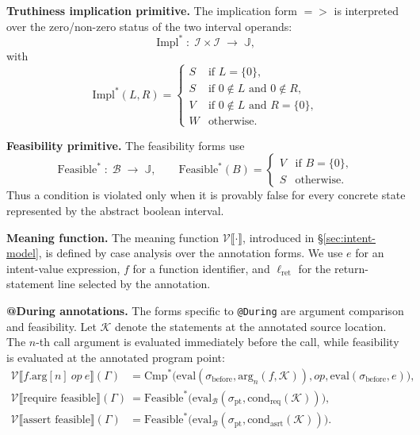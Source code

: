 \documentclass[pdflatex,sn-basic]{sn-jnl}%
\theoremstyle{thmstyleone}%
\theoremstyle{thmstyletwo}%
\theoremstyle{thmstylethree}%
\begin{document}
\smallskip
\noindent\textbf{Truthiness implication primitive.}
The implication form ${=}{>}$ is interpreted over the zero/non-zero status of
the two interval operands:
\[
\text{Impl}^*
  \;:\; \mathcal{I}\times\mathcal{I}\;\to\;\mathbb{J},
\]
with
\[
\text{Impl}^*(L,R)
=
\begin{cases}
S & \text{if } L=\{0\}, \\[2pt]
S & \text{if } 0\notin L \text{ and } 0\notin R, \\[2pt]
V & \text{if } 0\notin L \text{ and } R=\{0\}, \\[2pt]
W & \text{otherwise.}
\end{cases}
\]

\smallskip
\noindent\textbf{Feasibility primitive.}
The feasibility forms use
\[
\text{Feasible}^*
  \;:\; \mathcal{B}\;\to\;\mathbb{J},
\qquad
\text{Feasible}^*(B)
=
\begin{cases}
V & \text{if } B=\{0\}, \\
S & \text{otherwise.}
\end{cases}
\]
Thus a condition is violated only when it is provably false for every concrete
state represented by the abstract boolean interval.

\smallskip
\noindent\textbf{Meaning function.}
The meaning function
$\mathcal{V}\llbracket\cdot\rrbracket$,
introduced in \S\ref{sec:intent-model}, is defined by case analysis over the
annotation forms.
We use $e$ for an intent-value expression, $f$ for a function identifier,
and $\ell_{\text{ret}}$ for the return-statement line selected by the annotation.

\smallskip
\textbf{@During annotations.}
The forms specific to \texttt{@During} are argument comparison and feasibility.
Let $\mathcal{K}$ denote the statements at the annotated source location.
The $n$-th call argument is evaluated immediately before the call, while
feasibility is evaluated at the annotated program point:
\begin{align*}
\mathcal{V}\llbracket
f.\text{arg}[n]\ \mathit{op}\ e
\rrbracket(\Gamma)
&=
\text{Cmp}^*\bigl(
\text{eval}(\sigma_{\text{before}},\text{arg}_n(f,\mathcal{K})),
\mathit{op},
\text{eval}(\sigma_{\text{before}},e)
\bigr), \\[3pt]
%
\mathcal{V}\llbracket
\text{require feasible}
\rrbracket(\Gamma)
&=
\text{Feasible}^*\bigl(
\text{eval}_{\mathcal{B}}
(\sigma_{\text{pt}},\text{cond}_{\text{req}}(\mathcal{K}))
\bigr), \\[3pt]
%
\mathcal{V}\llbracket
\text{assert feasible}
\rrbracket(\Gamma)
&=
\text{Feasible}^*\bigl(
\text{eval}_{\mathcal{B}}
(\sigma_{\text{pt}},\text{cond}_{\text{asrt}}(\mathcal{K}))
\bigr).
\end{align*}
\end{document}
